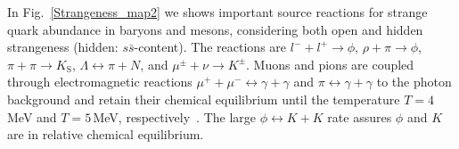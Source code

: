 \documentclass[Universe,article,submit,moreauthors,pdftex]{Definitions/mdpi}
\begin{document}
In Fig.~\ref{Strangeness_map2} we shows important source reactions for  strange quark abundance in baryons and mesons, considering both open and hidden strangeness (hidden: $s\bar s$-content). The reactions are $l^-+l^+\rightarrow\phi$, $\rho+\pi\rightarrow\phi$, $\pi+\pi\rightarrow K_\mathrm{S}$, $\Lambda \leftrightarrow \pi+ N$, and $\mu^\pm+\nu\rightarrow K^\pm$. Muons and pions are coupled through electromagnetic reactions $\mu^++\mu^-\leftrightarrow\gamma+\gamma$ and $\pi\leftrightarrow\gamma+\gamma$ to the photon background and retain their chemical equilibrium until the temperature $T =4$\, MeV and $T=5$\,MeV, respectively~\cite{Rafelski:2021aey,Kuznetsova:2008jt}. The large $\phi\leftrightarrow K+K$ rate assures $\phi$ and $K$ are in relative chemical equilibrium.
\end{document}
